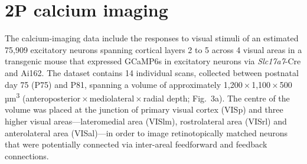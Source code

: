 \documentclass{article}
\begin{document}
\section*{2P calcium imaging}

The calcium-imaging data include the responses to visual stimuli of an estimated 75,909 excitatory neurons spanning cortical layers 2 to 5 across 4 visual areas in a transgenic mouse that expressed GCaMP6s in excitatory neurons via \emph{Slc17a7}-Cre and Ai162. The dataset contains 14 individual scans, collected between postnatal day 75 (P75) and P81, spanning a volume of approximately 1,200\,×\,1,100\,×\,500\,µm\textsuperscript{3} (anteroposterior\,×\,mediolateral\,×\,radial depth; Fig.~3a). The centre of the volume was placed at the junction of primary visual cortex (VISp) and three higher visual areas—lateromedial area (VISlm), rostrolateral area (VISrl) and anterolateral area (VISal)—in order to image retinotopically matched neurons that were potentially connected via inter-areal feedforward and feedback connections.
\end{document}
